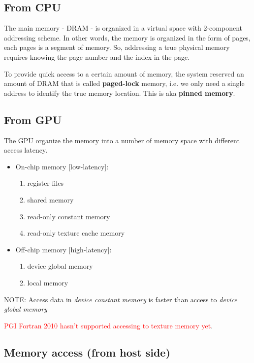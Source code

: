 \subsection{From CPU}
\label{sec:from-cpu}

The main memory - DRAM - is organized in a virtual space with
2-component addressing scheme. In other words, the memory is organized
in the form of pages, each pages is a segment of memory. So,
addressing a true physical memory requires knowing the page number and
the index in the page. 

To provide quick access to a certain amount of memory, the system
reserved an amount of DRAM that is called {\bf paged-lock} memory,
i.e. we only need a single address to identify the true memory
location. This is aka {\bf pinned memory}. 

\subsection{From GPU}
\label{sec:from-gpu}

The GPU organize the memory into a number of memory space with
different access latency. 
\begin{itemize}
\item On-chip memory [low-latency]:
  \begin{enumerate}
  \item register files
  \item shared memory
  \item read-only constant memory
  \item read-only texture cache memory
  \end{enumerate}
\item Off-chip memory [high-latency]:
  \begin{enumerate}
  \item device global memory
  \item local memory
  \end{enumerate}
\end{itemize}

NOTE: Access data in {\it device constant memory} is faster than
access to {\it device global memory}

\begin{framed}
  \textcolor{red}{PGI Fortran 2010 hasn't supported accessing to
    texture memory yet}.
\end{framed}

\subsection{Memory access (from host side)}
\label{sec:memory-access-from-host}

